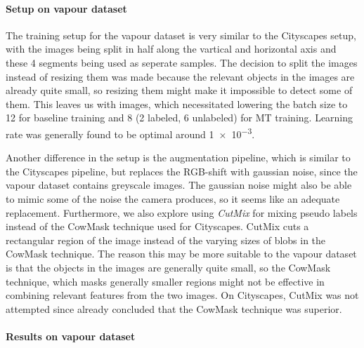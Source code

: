 \paragraph{Setup on vapour dataset}
The training setup for the vapour dataset is very similar to the Cityscapes setup, with the images being split in half along the vartical and horizontal axis and these 4 segments being used as seperate samples. The decision to split the images instead of resizing them was made because the relevant objects in the images are already quite small, so resizing them might make it impossible to detect some of them. This leaves us with  images, which necessitated lowering the batch size to 12 for baseline training and 8 (2 labeled, 6 unlabeled) for MT training.
Learning rate was generally found to be optimal around \num{1e-3}.

Another difference in the setup is the augmentation pipeline, which is similar to the Cityscapes pipeline, but replaces the RGB-shift with gaussian noise, since the vapour dataset contains greyscale images. The gaussian noise might also be able to mimic some of the noise the camera produces, so it seems like an adequate replacement.
Furthermore, we also explore using \emph{CutMix}\cite{yunCutMixRegularizationStrategy2019} for mixing pseudo labels instead of the CowMask technique used for Cityscapes. 
CutMix cuts a rectangular region of the image instead of the varying sizes of blobs in the CowMask technique.
The reason this may be more suitable to the vapour dataset is that the objects in the images are generally quite small, so the CowMask technique, which masks generally smaller regions might not be effective in combining relevant features from the two images. On Cityscapes, CutMix was not attempted since \cite{schererPseudoLabelNoiseSuppression2022} already concluded that the CowMask technique was superior.

\paragraph{Results on vapour dataset}

